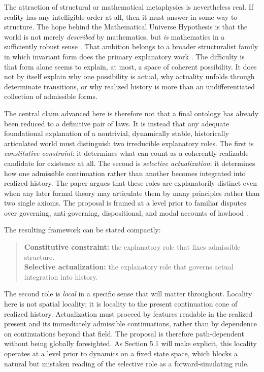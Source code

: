 \documentclass[11pt]{article}
\theoremstyle{foundation}
\begin{document}
The attraction of structural or mathematical metaphysics is nevertheless real. If reality has any intelligible order at all, then it must answer in some way to structure. The hope behind the Mathematical Universe Hypothesis is that the world is not merely \emph{described} by mathematics, but \emph{is} mathematics in a sufficiently robust sense \citep{Tegmark2008}. That ambition belongs to a broader structuralist family in which invariant form does the primary explanatory work \citep{Worrall1989,Ladyman1998,Shapiro1997,French2014,LadymanRoss2007}. The difficulty is that form alone seems to explain, at most, a space of coherent possibility. It does not by itself explain why one possibility is actual, why actuality unfolds through determinate transitions, or why realized history is more than an undifferentiated collection of admissible forms.

The central claim advanced here is therefore not that a final ontology has already been reduced to a definitive pair of laws. It is instead that any adequate foundational explanation of a nontrivial, dynamically stable, historically articulated world must distinguish two irreducible explanatory roles. The first is \emph{constitutive constraint}: it determines what can count as a coherently realizable candidate for existence at all. The second is \emph{selective actualization}: it determines how one admissible continuation rather than another becomes integrated into realized history. The paper argues that these roles are explanatorily distinct even when any later formal theory may articulate them by many principles rather than two single axioms. The proposal is framed at a level prior to familiar disputes over governing, anti-governing, dispositional, and modal accounts of lawhood \citep{Armstrong1983,Dretske1977,Tooley1977,vanFraassen1989,Bird2007,Ellis2001,Mumford2004,Maudlin2007}.

The resulting framework can be stated compactly:

\begin{quote}
\textbf{Constitutive constraint:} the explanatory role that fixes admissible structure.\\
\textbf{Selective actualization:} the explanatory role that governs actual integration into history.
\end{quote}

The second role is \emph{local} in a specific sense that will matter throughout. Locality here is not spatial locality; it is locality to the present continuation cone of realized history. Actualization must proceed by features readable in the realized present and its immediately admissible continuations, rather than by dependence on continuations beyond that field. The proposal is therefore path-dependent without being globally foresighted. As Section 5.1 will make explicit, this locality operates at a level prior to dynamics on a fixed state space, which blocks a natural but mistaken reading of the selective role as a forward-simulating rule.
\end{document}
